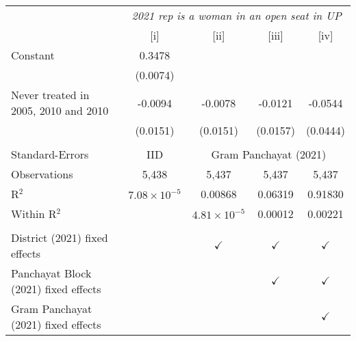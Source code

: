 
\begingroup
\centering
\begin{tabular}{lcccc}
   \toprule
    & \multicolumn{4}{c}{\textit{2021 rep is a woman in an open seat in UP}}\\
                                        & [i]                   & [ii]                  & [iii]         & [iv]\\  
   \midrule 
   Constant                             & 0.3478                &                       &               &   \\   
                                        & (0.0074)              &                       &               &   \\   
   Never treated in 2005, 2010 and 2010 & -0.0094               & -0.0078               & -0.0121       & -0.0544\\   
                                        & (0.0151)              & (0.0151)              & (0.0157)      & (0.0444)\\   
    \\
   Standard-Errors & IID & \multicolumn{3}{c}{Gram Panchayat (2021)} \\ 
   Observations                         & 5,438                 & 5,437                 & 5,437         & 5,437\\  
   R$^2$                                & $7.08\times 10^{-5}$  & 0.00868               & 0.06319       & 0.91830\\  
   Within R$^2$                         &                       & $4.81\times 10^{-5}$  & 0.00012       & 0.00221\\  
    \\
   District (2021) fixed effects        &                       & $\checkmark$          & $\checkmark$  & $\checkmark$\\   
   Panchayat Block (2021) fixed effects &                       &                       & $\checkmark$  & $\checkmark$\\   
   Gram Panchayat (2021) fixed effects  &                       &                       &               & $\checkmark$\\   
   \bottomrule
\end{tabular}
\par\endgroup


